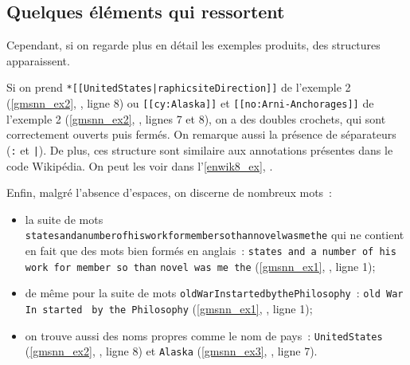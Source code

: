\subsection{Quelques éléments qui ressortent}
Cependant, si on regarde plus en détail les exemples produits, des structures apparaissent. 

Si on prend \lstinline!*[[UnitedStates|raphicsiteDirection]]! de l'exemple 2 (\autoref{gmsnn_ex2}, , ligne 8) ou 
\lstinline![[cy:Alaska]]! et \lstinline![[no:Arni-Anchorages]]! de l'exemple 2 (\autoref{gmsnn_ex2}, , lignes 7 et 8), on a des doubles crochets, qui sont correctement ouverts puis fermés. On remarque aussi la présence de séparateurs (\lstinline!:! et \lstinline!|!). De plus, ces structure sont similaire aux annotations présentes dans le code Wikipédia.
On peut les voir dans l'\autoref{enwik8_ex}, .

Enfin, malgré l'absence d'espaces, on discerne de nombreux mots~:
\begin{itemize}
	\item la suite de mots \lstinline!statesandanumberofhisworkformembersothannovelwasmethe! qui ne contient en fait que des mots bien formés en anglais~: \lstinline!states and a number of his work for member so than! \lstinline!novel was me the! (\autoref{gmsnn_ex1}, , ligne 1);
	\item de même pour la suite de mots \lstinline!oldWarInstartedbythePhilosophy!~: \lstinline!old War In started! \lstinline! by the Philosophy!
	(\autoref{gmsnn_ex1}, , ligne 1);
	\item on trouve aussi des noms propres comme le nom de pays~: \lstinline!UnitedStates! (\autoref{gmsnn_ex2}, , ligne 8) et \lstinline!Alaska! (\autoref{gmsnn_ex3}, , ligne 7).
\end{itemize}